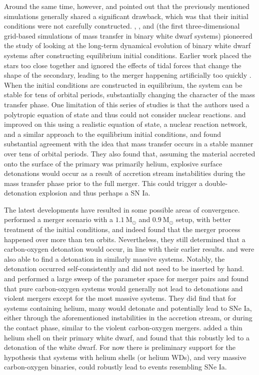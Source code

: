\documentclass[iop]{../emulateapj}
\newcommand{\msolar}{\mathrm{M}_\odot}
\begin{document}
Around the same time, however, \cite{guillochon:2010} and
\cite{dan:2011} pointed out that the previously mentioned simulations 
generally shared a significant drawback, which was that their initial conditions
were not carefully constructed. \cite{motl:2002}, \cite{dsouza:2006},
and \cite{motl:2007} (the first three-dimensional grid-based
simulations of mass transfer in binary white dwarf systems) pioneered
the study of looking at the long-term dynamical evolution of binary
white dwarf systems after constructing equilibrium initial
conditions. Earlier work placed the stars too close together 
and ignored the effects of tidal forces that change the shape of the 
secondary, leading to the merger
happening artificially too quickly \citep{fryer:2008}. When the initial conditions are
constructed in equilibrium, the system can be stable for tens of
orbital periods, substantially changing the character of the mass
transfer phase. One limitation of this series of studies is
that the authors used a polytropic equation of state and thus could
not consider nuclear reactions. \cite{guillochon:2010} and
\cite{dan:2011} improved on this using a realistic equation of state,
a nuclear reaction network, and a similar approach to the equilibrium
initial conditions, and found substantial agreement with the idea that
mass transfer occurs in a stable manner over tens of orbital
periods. They also found that, assuming the material accreted onto the
surface of the primary was primarily helium, explosive surface
detonations would occur as a result of accretion stream instabilities
during the mass transfer phase prior to the full merger. This could
trigger a double-detonation explosion and thus perhaps a SN Ia.

The latest developments have resulted in some possible areas of convergence.
\cite{pakmor:2012} performed a merger scenario
with a $1.1\ \msolar$ and $0.9\ \msolar$ setup, with better treatment
of the initial conditions, and indeed found that the merger process
happened over more than ten orbits. Nevertheless, they still determined
that a carbon-oxygen detonation would occur, in line with their
earlier results. \cite{moll:2014} and \cite{kashyap:2015} were also 
able to find a detonation in similarly massive systems. Notably,
the detonation occurred self-consistently and did not need to be inserted 
by hand. \cite{dan:2012} and \cite{dan:2014} performed a large sweep 
of the parameter space for merger pairs and
found that pure carbon-oxygen systems would generally not lead to
detonations and violent mergers except for the most massive
systems. They did find that for systems containing helium, many
would detonate and potentially lead to SNe Ia, either through the
aforementioned instabilities in the accretion stream, or during the
contact phase, similar to the violent carbon-oxygen
mergers. \cite{pakmor:2013} added a thin helium shell on their primary
white dwarf, and found that this robustly led to a detonation of the
white dwarf. For now there is preliminary support for the hypothesis
that systems with helium shells (or helium WDs), and very massive carbon-oxygen binaries,
could robustly lead to events resembling SNe Ia.
\end{document}
